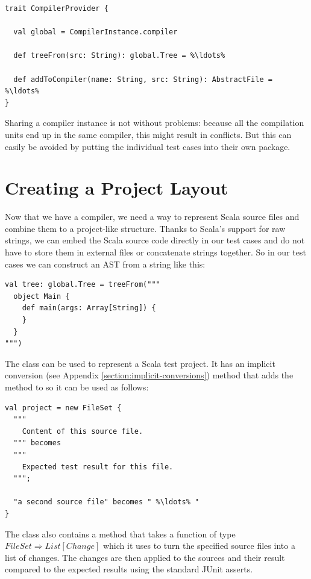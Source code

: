 \documentclass[10pt,a4paper,oneside]{scrreprt}
\begin{document}
\begin{lstlisting}
trait CompilerProvider {

  val global = CompilerInstance.compiler
    
  def treeFrom(src: String): global.Tree = %\ldots%
  
  def addToCompiler(name: String, src: String): AbstractFile = %\ldots%
}
\end{lstlisting}

Sharing a compiler instance is not without problems: because all the compilation units end up in the same compiler, this might result in conflicts. But this can easily be avoided by putting the individual test cases into their own package.

\section{Creating a Project Layout}

Now that we have a compiler, we need a way to represent Scala source files and combine them to a project-like structure. Thanks to Scala's support for raw strings, we can embed the Scala source code directly in our test cases and do not have to store them in external files or concatenate strings together. So in our test cases we can construct an AST from a string like this:

\begin{lstlisting}
val tree: global.Tree = treeFrom("""
  object Main {
    def main(args: Array[String]) {
    }
  }
""")
\end{lstlisting}

The  class can be used to represent a Scala test project. It has an implicit conversion (see Appendix \vref{section:implicit-conversions}) method that adds the  method to  so it can be used as follows:

\begin{lstlisting}
val project = new FileSet {
  """
    Content of this source file.
  """ becomes
  """
    Expected test result for this file.
  """;

  "a second source file" becomes " %\ldots% "
}
\end{lstlisting}

The  class also contains a method  that takes a function of type $FileSet \Rightarrow List[Change]$ which it uses to turn the specified source files into a list of changes. The changes are then applied to the sources and their result compared to the expected results using the standard JUnit asserts.
\end{document}
